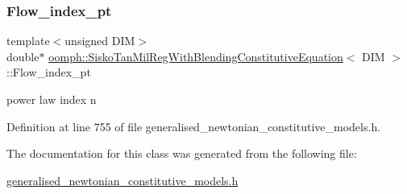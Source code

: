 \subsubsection{\texorpdfstring{Flow\+\_\+index\+\_\+pt}{Flow\_index\_pt}}
{\footnotesize\ttfamily template$<$unsigned D\+IM$>$ \\
double$\ast$ \hyperlink{classoomph_1_1SiskoTanMilRegWithBlendingConstitutiveEquation}{oomph\+::\+Sisko\+Tan\+Mil\+Reg\+With\+Blending\+Constitutive\+Equation}$<$ D\+IM $>$\+::Flow\+\_\+index\+\_\+pt\hspace{0.3cm}{\ttfamily [private]}}



power law index n 



Definition at line 755 of file generalised\+\_\+newtonian\+\_\+constitutive\+\_\+models.\+h.



The documentation for this class was generated from the following file\+:\begin{DoxyCompactItemize}
\item 
\hyperlink{generalised__newtonian__constitutive__models_8h}{generalised\+\_\+newtonian\+\_\+constitutive\+\_\+models.\+h}\end{DoxyCompactItemize}
